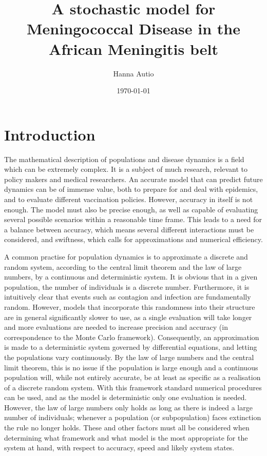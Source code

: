 \documentclass[10pt,a4paper]{article}
\author{Hanna Autio}
\title{A stochastic model for Meningococcal Disease in the African Meningitis belt} %
\date{\today}
\begin{document}
\maketitle
\thispagestyle{empty}
\cleardoublepage
\newpage
\setcounter{page}{1}



\section{Introduction}

The mathematical description of populations and disease dynamics is a field which can be extremely complex. It is a subject of much research, relevant to policy makers and medical researchers. An accurate model that can predict future dynamics can be of immense value, both to prepare for and deal with epidemics, and to evaluate different vaccination policies. However, accuracy in itself is not enough. The model must also be precise enough, as well as capable of evaluating several possible scenarios within a reasonable time frame. This leads to a need for a balance between accuracy, which means several different interactions must be considered, and swiftness, which calls for approximations and numerical efficiency.

A common practise for population dynamics is to approximate a discrete and random system, according to the central limit theorem and the law of large numbers, by a continuous and deterministic system. It is obvious that in a given population, the number of individuals is a discrete number. Furthermore, it is intuitively clear that events such as contagion and infection are fundamentally random. However, models that incorporate this randomness into their structure are in general significantly slower to use, as a single evaluation will take longer and more evaluations are needed to increase precision and accuracy (in correspondence to the Monte Carlo framework). Consequently, an approximation is made to a deterministic system governed by differential equations, and letting the populations vary continuously. By the law of large numbers and the central limit theorem, this is no issue if the population is large enough and a continuous population will, while not entirely accurate, be at least as specific as a realisation of a discrete random system. With this framework standard numerical procedures can be used, and as the model is deterministic only one evaluation is needed. However, the law of large numbers only holds as long as there is indeed a large number of individuals; whenever a population (or subpopulation) faces extinction the rule no longer holds. These and other factors must all be considered when determining what framework and what model is the most appropriate for the system at hand, with respect to accuracy, speed and likely system states.
\end{document}
